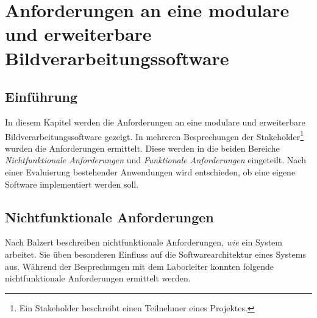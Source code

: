 \chapter{Anforderungen an eine modulare und erweiterbare Bildverarbeitungssoftware}\label{anforderungen}

\section{Einführung}

In diesem Kapitel werden die Anforderungen an eine modulare und erweiterbare Bildverarbeitungssoftware gezeigt. In mehreren Besprechungen der Stakeholder\footnote{Ein Stakeholder beschreibt einen Teilnehmer eines Projektes.} wurden die Anforderungen ermittelt. Diese werden in die beiden Bereiche \textit{Nichtfunktionale Anforderungen} und \textit{Funktionale Anforderungen} eingeteilt. Nach einer Evaluierung bestehender Anwendungen wird entschieden, ob eine eigene Software implementiert werden soll.


\section{Nichtfunktionale Anforderungen}

Nach Balzert \cite[9]{balzert:swa} beschreiben nichtfunktionale Anforderungen, \textit{wie} ein System arbeitet. Sie üben besonderen Einfluss auf die Softwarearchitektur eines Systems aus.
Während der Besprechungen mit dem Laborleiter konnten folgende nichtfunktionale Anforderungen ermittelt werden.

